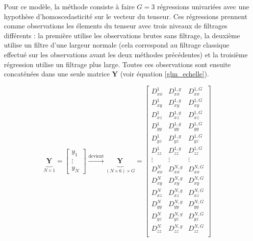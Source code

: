 Pour ce modèle, la méthode consiste à faire $G=3$ régressions univariées avec une hypothèse d'homoscedasticité sur le vecteur du tenseur. 
Ces régressions prennent comme observations les élements du tenseur avec trois niveaux de filtrages différents : la première utilise les observations brutes sans filtrage, la deuxième utilise un filtre d'une largeur normale (cela correspond au filtrage classique effectué sur les observations avant les deux méthodes précédentes) et la troisième régression utilise un filtrage plus large.
Toutes ces observations sont ensuite concaténées dans une seule matrice $\mathbf{Y}$ (voir équation \eqref{glm_echelle}).

\begin{equation}
    \underbrace{\mathbf{Y}_{}}_{N\times 1} = \left[\begin{array}{c}
                                             y_1\\
                                             \vdots\\
                                             y_N
                                         \end{array}\right]
  \xrightarrow{\text{devient}}
  \underbrace{\mathbf{Y}_{}}_{(N\times 6)\times G} = \left[\begin{array}{ccc}
                                             D^1_{xx} & D^{1,g}_{xx} & D^{1,G}_{xx}\\
                                             D^1_{xy} & D^{1,g}_{xy} & D^{1,G}_{xy}\\
                                             D^1_{xz} & D^{1,g}_{xz} & D^{1,G}_{xz}\\
                                             D^1_{yy} & D^{1,g}_{yy} & D^{1,G}_{yy}\\
                                             D^1_{yz} & D^{1,g}_{yz} & D^{1,G}_{yz}\\
                                             D^1_{zz} & D^{1,g}_{zz} & D^{1,G}_{zz}\\
                                             \vdots & \vdots & \vdots\\
                                             D^N_{xx} & D^{N,g}_{xx} & D^{N,G}_{xx}\\
                                             D^N_{xy} & D^{N,g}_{xy} & D^{N,G}_{xy}\\
                                             D^N_{xz} & D^{N,g}_{xz} & D^{N,G}_{xz}\\
                                             D^N_{yy} & D^{N,g}_{yy} & D^{N,G}_{yy}\\
                                             D^N_{yz} & D^{N,g}_{yz} & D^{N,G}_{yz}\\
                                             D^N_{zz} & D^{N,g}_{zz} & D^{N,G}_{zz}\\
                                         \end{array}\right]
  \label{glm_echelle}
\end{equation}

